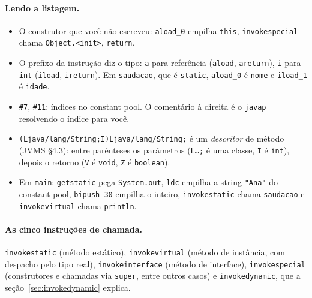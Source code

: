 \paragraph{Lendo a listagem.}
\begin{itemize}
\item O construtor que você não escreveu: \texttt{aload\_0} empilha
  \texttt{this}, \texttt{invokespecial} chama
  \texttt{Object.<init>}, \texttt{return}.
\item O prefixo da instrução diz o tipo: \texttt{a} para referência
  (\texttt{aload}, \texttt{areturn}), \texttt{i} para \texttt{int}
  (\texttt{iload}, \texttt{ireturn}). Em \texttt{saudacao}, que é
  \texttt{static}, \texttt{aload\_0} é \texttt{nome} e \texttt{iload\_1}
  é \texttt{idade}.
\item \texttt{\#7}, \texttt{\#11}: índices no constant pool. O
  comentário à direita é o \texttt{javap} resolvendo o índice para você.
\item \nolinkurl{(Ljava/lang/String;I)Ljava/lang/String;} é um
  \emph{descritor} de método (JVMS §4.3): entre parênteses os parâmetros
  (\texttt{L\ldots;} é uma classe, \texttt{I} é \texttt{int}), depois o
  retorno (\texttt{V} é \texttt{void}, \texttt{Z} é \texttt{boolean}).
\item Em \texttt{main}: \texttt{getstatic} pega \texttt{System.out},
  \texttt{ldc} empilha a string \texttt{"Ana"} do constant pool,
  \texttt{bipush 30} empilha o inteiro, \texttt{invokestatic} chama
  \texttt{saudacao} e \texttt{invokevirtual} chama \texttt{println}.
\end{itemize}

\paragraph{As cinco instruções de chamada.}
\texttt{invokestatic} (método estático), \texttt{invokevirtual} (método
de instância, com despacho pelo tipo real), \texttt{invokeinterface}
(método de interface), \texttt{invokespecial} (construtores e
chamadas via \texttt{super}, entre outros casos) e \texttt{invokedynamic}, que a
seção~\ref{sec:invokedynamic} explica.
